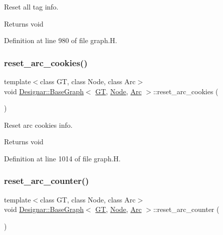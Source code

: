 Reset all tag info. 

\begin{DoxyReturn}{Returns}
void 
\end{DoxyReturn}


Definition at line 980 of file graph.\+H.

\mbox{\label{class_designar_1_1_base_graph_a44b6cefb8966ed69a0d80bfe7e4546cb}} 
\subsubsection{\texorpdfstring{reset\+\_\+arc\+\_\+cookies()}{reset\_arc\_cookies()}}
{\footnotesize\ttfamily template$<$class GT, class Node, class Arc$>$ \\
void \hyperlink{class_designar_1_1_base_graph}{Designar\+::\+Base\+Graph}$<$ \hyperlink{demo-buildgraph_8_c_a3001c40d2c31ca87ed96cd7d1334a55e}{GT}, \hyperlink{namespace_designar_a5af326c65aa2bd26b26c410f2030d09e}{Node}, \hyperlink{namespace_designar_a3f55fb5513d62ff47cbc8f72b8e95d6f}{Arc} $>$\+::reset\+\_\+arc\+\_\+cookies (\begin{DoxyParamCaption}{ }\end{DoxyParamCaption})\hspace{0.3cm}{\ttfamily [inline]}}



Reset arc cookies info. 

\begin{DoxyReturn}{Returns}
void 
\end{DoxyReturn}


Definition at line 1014 of file graph.\+H.

\mbox{\label{class_designar_1_1_base_graph_a8b22e29aa37006fab9c219de86660bdd}} 
\subsubsection{\texorpdfstring{reset\+\_\+arc\+\_\+counter()}{reset\_arc\_counter()}}
{\footnotesize\ttfamily template$<$class GT, class Node, class Arc$>$ \\
void \hyperlink{class_designar_1_1_base_graph}{Designar\+::\+Base\+Graph}$<$ \hyperlink{demo-buildgraph_8_c_a3001c40d2c31ca87ed96cd7d1334a55e}{GT}, \hyperlink{namespace_designar_a5af326c65aa2bd26b26c410f2030d09e}{Node}, \hyperlink{namespace_designar_a3f55fb5513d62ff47cbc8f72b8e95d6f}{Arc} $>$\+::reset\+\_\+arc\+\_\+counter (\begin{DoxyParamCaption}{ }\end{DoxyParamCaption})\hspace{0.3cm}{\ttfamily [inline]}}



